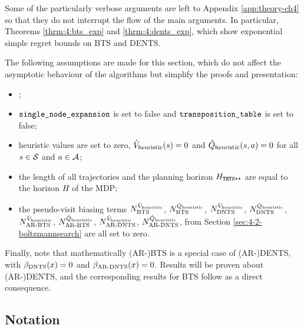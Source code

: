     Some of the particularly verbose arguments are left to Appendix \ref{app:theory-ch4} so that they do not interrupt the flow of the main arguments. In particular, Theorems \ref{thrm:4:bts_exp} and \ref{thrm:4:dents_exp}, which show exponential simple regret bounds on BTS and DENTS.

    The following assumptions are made for this section, which do not affect the asymptotic behaviour of the algorithms but simplify the proofs and presentation:
    \begin{itemize}
        \item {};
        \item ${\textnormal{\texttt{single\_node\_expansion}}}$ is set to false and ${\textnormal{\texttt{transposition\_table}}}$ is set to false;
        \item heuristic values are set to zero, ${\hat{V}_{\textnormal{heuristic}}}(s)=0$ and ${\hat{Q}_{\textnormal{heuristic}}}(s,a)=0$ for all $s\in\mathcal{S}$ and $a\in\mathcal{A}$;
        \item the length of all trajectories and the planning horizon $H_{{\textnormal{\texttt{THTS++}}}}$ are equal to the horizon $H$ of the MDP;
        \item the pseudo-visit biasing terms $N^{{\hat{V}_{\textnormal{heuristic}}}}_{{\textnormal{BTS}}}$, $N^{{\hat{Q}_{\textnormal{heuristic}}}}_{{\textnormal{BTS}}}$, $N^{{\hat{V}_{\textnormal{heuristic}}}}_{{\textnormal{DNTS}}}$, $N^{{\hat{Q}_{\textnormal{heuristic}}}}_{{\textnormal{DNTS}}}$, $N^{{\hat{V}_{\textnormal{heuristic}}}}_{{\textnormal{AR-BTS}}}$, $N^{{\hat{Q}_{\textnormal{heuristic}}}}_{{\textnormal{AR-BTS}}}$, $N^{{\hat{V}_{\textnormal{heuristic}}}}_{{\textnormal{AR-DNTS}}}$, $N^{{\hat{Q}_{\textnormal{heuristic}}}}_{{\textnormal{AR-DNTS}}}$, from Section \ref{sec:4-2-boltzmannsearch} are all set to zero.
    \end{itemize}

    Finally, note that mathematically (AR-)BTS is a special case of (AR-)DENTS, with ${\beta_{{\textnormal{DNTS}}}}(x)=0$ and ${\beta_{{\textnormal{AR-DNTS}}}}(x)=0$. Results will be proven about \mbox{(AR-)DENTS}, and the corresponding results for BTS follow as a direct consequence.











\subsection{Notation}
\label{sec:4-5-1-notation}

